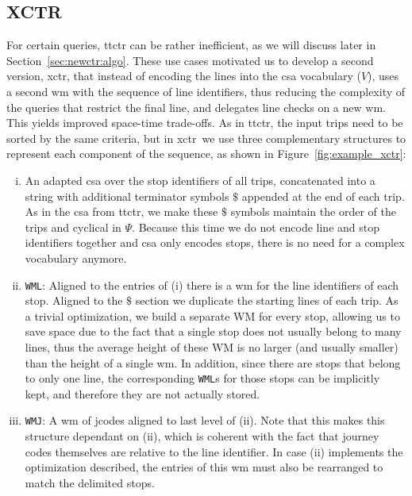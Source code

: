     \subsection{XCTR}
    \label{sec:newctr:str:xctr}
    For certain queries, \gls{ttctr} can be rather inefficient, as we will discuss later in Section~\ref{sec:newctr:algo}. These use cases motivated us to develop a second version, \gls{xctr}, that instead of encoding the lines into the \gls{csa} vocabulary ($V$), uses a second \gls{wm} with the sequence of line identifiers, thus reducing the complexity of the queries that restrict the final line, and delegates line checks on a new \gls{wm}. This yields improved \mbox{space-time} trade-offs. As in \gls{ttctr}, the input trips need to be sorted by the same criteria, but in \gls{xctr}~we use three complementary structures to represent each component of the sequence, as shown in Figure~\ref{fig:example_xctr}:
    \begin{enumerate}[(i)]
        \item An adapted \gls{csa} over the stop identifiers of all trips, concatenated into a string with additional terminator symbols $\$$ appended at the end of each trip. As in the \gls{csa} from \gls{ttctr}, we make these $\$$ symbols maintain the order of the trips and cyclical in $\Psi$. Because this time we do not encode line and stop identifiers together and \gls{csa} only encodes stops, there is no need for a complex vocabulary anymore.
        \item \texttt{WML}: Aligned to the entries of (i) there is a \gls{wm} for the line identifiers of each stop. Aligned to the $\$$ section we duplicate the starting lines of each trip. As a trivial optimization, we build a separate WM for every stop, allowing us to save space due to the fact that a single stop does not usually belong to many lines, thus the average height of these WM is no larger (and usually smaller) than the height of a single \gls{wm}. In addition, since there are stops that belong to only one line, the corresponding \texttt{WML}s for those stops can be implicitly kept, and therefore they are not actually stored.
        \item \texttt{WMJ}: A \gls{wm} of jcodes aligned to last level of (ii). Note that this makes this structure dependant on (ii), which is coherent with the fact that journey codes themselves are relative to the line identifier. In case (ii) implements the optimization described, the entries of this \gls{wm} must also be rearranged to match the delimited stops.
    \end{enumerate}
    
